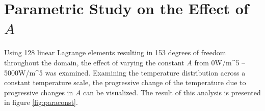 \documentclass[letterpaper,10pt]{article}
\begin{document}
\section{Parametric Study on the Effect of $A$}
Using 128 linear Lagrange elements resulting in 153 degrees of freedom throughout the domain, the effect of varying the constant $A$ from \unit{0}{W/m^5} -- \unit{5000}{W/m^5} was examined. Examining the temperature distribution across a constant temperature scale, the progressive change of the temperature due to progressive changes in $A$ can be visualized. The result of this analysis is presented in figure \ref{fig:paraconst}.

\begin{figure}[H]
	\centering
	 \\
	 \\

\end{figure}
\end{document}

